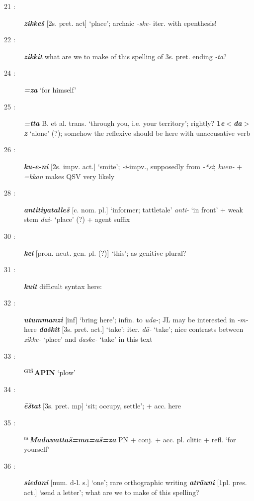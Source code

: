 \documentclass[10pt]{article}
\newcommand{\supersc}[1]{$^{\textrm{\scriptsize{#1}}}$}  	%
\newcommand{\bit}[1]{\textbf{\textit{#1}}}				%
\newcommand{\p}[1]{{\tiny[{#1}]}}					%
\newcommand{\hith}{\textsubwedge{h}}
\newcommand{\wood}{\supersc{GI\v{S}}}
\renewcommand{\.}[1]{\textsubdot{#1}}
\begin{document}
\begin{description}
\item[21 :] \bit{zikke\v{s}} \p{2s. pret. act} `place'; archaic \textit{-ske-} iter. with epenthesis! 

\item[22 :] \bit{zikkit} what are we to make of this spelling of 3s. pret. ending \textit{-ta}?

\item[24 :] \bit{=za} `for himself'

\item[25 :] \bit{=tta} B. et al. trans. `through you, i.e. your territory'; rightly? \textbf{1}\bit{e$<$da$>$z} `alone' (?); somehow the reflexive should be here with unaccusative verb 

\item[26 :] \bit{ku-e-ni} \p{2s. impv. act.} `smite'; \textit{-i}-impv., supposedly from \textit{-*si}; \textit{kuen-} + \textit{=kkan} makes QSV very likely 

\item[28 :] \bit{{\hith}antitiyatalle\v{s}} \p{c. nom. pl.} `informer; tattletale' \textit{{\hith}anti-} `in front' + weak stem \textit{dai-} `place' (?) + agent suffix

\item[30 :] \bit{k\=el} \p{pron. neut. gen. pl. (?)} `this'; as genitive plural?

\item[31 :] \bit{kuit} difficult syntax here:

\item[32 :] \bit{utummanzi} \p{inf} `bring here'; infin. to \textit{uda-}; JL may be interested in \textit{-m-} here \bit{da\v{s}kit} \p{3s. pret. act.} `take'; iter. \textit{d\=a-} `take'; nice contrasts between \textit{zikke-} `place' and \textit{daske-} `take' in this text

\item[33 :] \textbf{{\wood}APIN} `plow'

\item[34 :] \bit{\=e\v{s}tat} \p{3s. pret. mp} `sit; occupy, settle'; + acc. here

\item[35 :] \textbf{\supersc{m}}\bit{Maduwatta\v{s}=ma=a\v{s}=za} PN + conj. + acc. pl. clitic + refl. `for yourself'

\item[36 :] \bit{siedani} \p{num. d-l. s.} `one'; rare orthographic writing \bit{{\hith}atr\=auni} \p{1pl. pres. act.} `send a letter'; what are we to make of this spelling?


\end{description}
\end{document}
